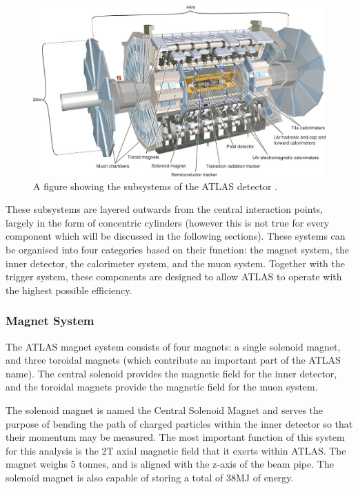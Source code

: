 \documentclass[12pt,a4paper,epsf,portrait,times,epsfig]{article}
\begin{document}
		\begin{figure}
			\centering
			\includegraphics{ATLAS}
			\caption{A figure showing the subsystems of the ATLAS detector \cite{Article:ATLASDesignPaper}.}
			\label{Fig:ATLASDetector}
		\end{figure}
		
		These subsystems are layered outwards from the central interaction points, largely in the form of concentric cylinders (however this is not true for every component which will be discussed in the following sections). These systems can be	organised into four categories based on their function: the magnet system, the inner detector, the calorimeter system, and the muon system. Together with the trigger system, these components are designed to allow ATLAS to operate with the highest possible efficiency. \par
		
		\subsubsection{Magnet System}
		
		The ATLAS magnet system consists of four magnets: a single solenoid magnet, and three toroidal magnets (which contribute an important part of the ATLAS name). The central solenoid provides the magnetic field for the inner detector, and the toroidal magnets provide the magnetic field	for the muon system. \par

		The solenoid magnet is named the Central Solenoid Magnet and serves the purpose of bending the path of charged particles within the inner detector so that their momentum	may be measured. The most important function of this system for this analysis is the 2T	axial magnetic field that it exerts within ATLAS. The magnet weighs 5 tonnes, and is aligned with the z-axis of the beam pipe. The solenoid magnet is also capable of storing	a total of 38MJ of energy. \par
		
\end{document}
